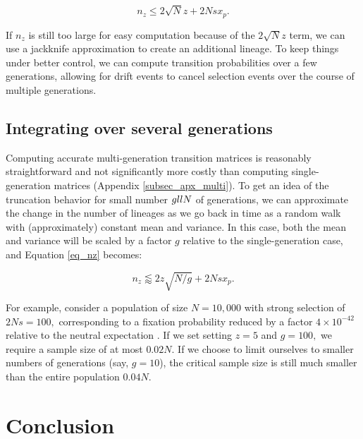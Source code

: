 \documentclass[review]{elsarticle}
\begin{document}
\begin{equation*}
  n_z \leq 2 \sqrt{N} z + 2Nsx_p.
\end{equation*}


If $n_z$ is still too large for easy computation because of the $2 \sqrt{N} z$ term, we 
can use a jackknife approximation to create an additional lineage.  To keep things 
under better control, we can compute transition probabilities over a few generations, 
allowing for drift events to cancel selection events over the course of multiple generations.  

\subsection{Integrating over several generations} 

Computing accurate multi-generation transition matrices is reasonably straightforward 
and not significantly more costly than computing single-generation matrices 
(Appendix \ref{subsec_apx_multi}). To get an idea of the truncation behavior 
for small number $g \\ll N$ of generations, we can approximate the change  in the number 
of lineages as we go back in time as a random walk with (approximately) constant mean and 
variance. In this case, both the mean and variance will be scaled by a factor $g$ relative 
to the single-generation case, and Equation \eqref{eq_nz} becomes:

\begin{equation}
  n_z \lessapprox 2 z\sqrt{N/g} + 2N s x_p.
\label{eq_nzg}
\end{equation}

For example, consider a population of size $N=10,000$ with strong selection
of $2Ns = 100,$ corresponding to a fixation probability reduced by a factor $4\times 10^{-42}$ relative 
to the neutral expectation \cite{Kimura:1962um}.  If we set setting $z=5$ and $g=100,$ we require a sample size of at most $0.02 N.$
 If we choose to limit ourselves to smaller numbers of generations (say, $g=10$), the critical sample 
 size is still much smaller than the entire population $0.04N$.
 
 
\section{Conclusion}
\label{sec_conclusion}

\end{document}
